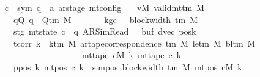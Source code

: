 \begin{isabellebody}
\ \ \ \ \ c{}\ {\isacharcolon}{\kern0pt}{\isacharcolon}{\kern0pt}\ {\isachardoublequoteopen}{\isacharparenleft}{\kern0pt}sym{}{\isacharcomma}{\kern0pt}\ {\isacharprime}{\kern0pt}q\ {\isasymtimes}\ {\isacharprime}{\kern0pt}a\ ar{\isacharunderscore}{\kern0pt}stage{\isacharparenright}{\kern0pt}\ mt{\isacharunderscore}{\kern0pt}config{\isachardoublequoteclose}\isanewline
\ \ \ vM{\isacharcolon}{\kern0pt}\ {\isachardoublequoteopen}valid{\isacharunderscore}{\kern0pt}mttm\ M{\isachardoublequoteclose}\isanewline
\ \ \ \ \ \ \ qQ{\isacharcolon}{\kern0pt}\ {\isachardoublequoteopen}q\ {\isasymin}\ Q{\isacharunderscore}{\kern0pt}tm\ M{\isachardoublequoteclose}\isanewline
\ \ \ \ \ \ \ kge{}{\isacharcolon}{\kern0pt}\ {\isachardoublequoteopen}{}\ {\isasymle}\ block{\isacharunderscore}{\kern0pt}width\ {\isacharparenleft}{\kern0pt}{\isasymGamma}{\isacharunderscore}{\kern0pt}tm\ M{\isacharparenright}{\kern0pt}{\isachardoublequoteclose}\isanewline
\ \ \ \ \ \ \ stg{}{\isacharcolon}{\kern0pt}\ {\isachardoublequoteopen}mt{\isacharunderscore}{\kern0pt}state\ c{}\ {\isacharequal}{\kern0pt}\ {\isacharparenleft}{\kern0pt}q{\isacharcomma}{\kern0pt}\ AR{\isacharunderscore}{\kern0pt}SimRead{\isacharcomma}{\kern0pt}\ {}{\isacharcomma}{\kern0pt}\ {}{\isacharcomma}{\kern0pt}\ buf{}{\isacharcomma}{\kern0pt}\ dvec{\isacharcomma}{\kern0pt}\ posk{}{\isacharparenright}{\kern0pt}{\isachardoublequoteclose}\isanewline
\ \ \ \ \ \ \ tcorr{\isacharcolon}{\kern0pt}\ {\isachardoublequoteopen}{\isasymforall}k\ {\isacharless}{\kern0pt}\ k{\isacharunderscore}{\kern0pt}tm\ M{\isachardot}{\kern0pt}\ ar{\isacharunderscore}{\kern0pt}tape{\isacharunderscore}{\kern0pt}correspondence\ {\isacharparenleft}{\kern0pt}{\isasymGamma}{\isacharunderscore}{\kern0pt}tm\ M{\isacharparenright}{\kern0pt}\ {\isacharparenleft}{\kern0pt}le{\isacharunderscore}{\kern0pt}tm\ M{\isacharparenright}{\kern0pt}\ {\isacharparenleft}{\kern0pt}bl{\isacharunderscore}{\kern0pt}tm\ M{\isacharparenright}{\kern0pt}\isanewline
\ \ \ \ \ \ \ \ \ \ \ \ \ \ \ \ \ \ \ \ \ \ \ {\isacharparenleft}{\kern0pt}mt{\isacharunderscore}{\kern0pt}tape\ cM\ k{\isacharparenright}{\kern0pt}\ {\isacharparenleft}{\kern0pt}mt{\isacharunderscore}{\kern0pt}tape\ c{}\ k{\isacharparenright}{\kern0pt}{\isachardoublequoteclose}\isanewline
\ \ \ \ \ \ \ ppos{\isacharcolon}{\kern0pt}\ {\isachardoublequoteopen}{\isasymAnd}k{\isachardot}{\kern0pt}\ mt{\isacharunderscore}{\kern0pt}pos\ c{}\ k\ {\isacharequal}{\kern0pt}\ sim{\isacharunderscore}{\kern0pt}pos\ {\isacharparenleft}{\kern0pt}block{\isacharunderscore}{\kern0pt}width\ {\isacharparenleft}{\kern0pt}{\isasymGamma}{\isacharunderscore}{\kern0pt}tm\ M{\isacharparenright}{\kern0pt}{\isacharparenright}{\kern0pt}\ {\isacharparenleft}{\kern0pt}mt{\isacharunderscore}{\kern0pt}pos\ cM\ k{\isacharparenright}{\kern0pt}{\isachardoublequoteclose}\isanewline

\end{isabellebody}
